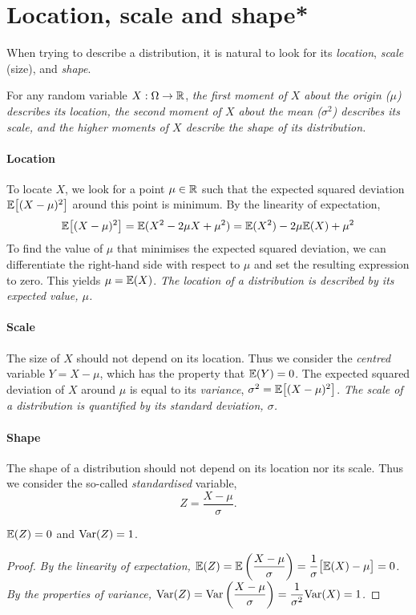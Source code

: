 \section{Location, scale and shape*}
When trying to describe a distribution, it is natural to look for its \emph{location}, \emph{scale} (size), and \emph{shape}.

\bigskip
For any random variable $X:\Omega\to\mathbb{R}$,
\ben
\it the first moment of $X$ about the origin ($\mu$)  describes its location, 
\it the second moment of $X$ about the mean ($\sigma^2$) describes its scale, and
\it the higher moments of $X$ describe the shape of its distribution.
\een

\paragraph{Location}
To locate $X$, we look for a point $\mu\in\mathbb{R}$ such that the expected squared deviation $\mathbb{E}\big[(X-\mu)^2\big]$ around this point is minimum. By the linearity of expectation,
\[
\mathbb{E}\big[(X-\mu)^2\big] = \mathbb{E}(X^2 - 2\mu X + \mu^2) = \mathbb{E}(X^2) - 2\mu\mathbb{E}(X) + \mu^2
\]
To find the value of $\mu$ that minimises the expected squared deviation, we can differentiate the right-hand side with respect to $\mu$ and set the resulting expression to zero. This yields $\mu=\mathbb{E}(X)$.
\bit
\it The location of a distribution is described by its \emph{expected value}, $\mu$.
\eit

\paragraph{Scale}
The size of $X$ should not depend on its location. Thus we consider the \emph{centred} variable $Y=X-\mu$, which has the property that $\mathbb{E}(Y)=0$. The expected squared deviation of $X$ around $\mu$ is equal to its \emph{variance}, $\sigma^2 = \mathbb{E}\big[(X-\mu)^2\big]$. 
\bit
\it The scale of a distribution is quantified by its \emph{standard deviation}, $\sigma$.
\eit

\paragraph{Shape}
The shape of a distribution should not depend on its location nor its scale. Thus we consider the so-called \emph{standardised} variable,
\[
Z = \frac{X-\mu}{\sigma}.
\]
\vspace*{-4ex}
\begin{lemma}
$\mathbb{E}(Z)=0$ and $\text{Var}(Z)=1$.
\end{lemma}
\begin{proof}
\bit
\it By the linearity of expectation, $\displaystyle\mathbb{E}(Z)=\mathbb{E}\left(\frac{X-\mu}{\sigma}\right)=\frac{1}{\sigma}\big[\mathbb{E}(X)-\mu\big] = 0$.
\it By the properties of variance, $\displaystyle\text{Var}(Z)=\text{Var}\left(\frac{X-\mu}{\sigma}\right)=\frac{1}{\sigma^2}\text{Var}(X) = 1$.
\eit
\end{proof}
